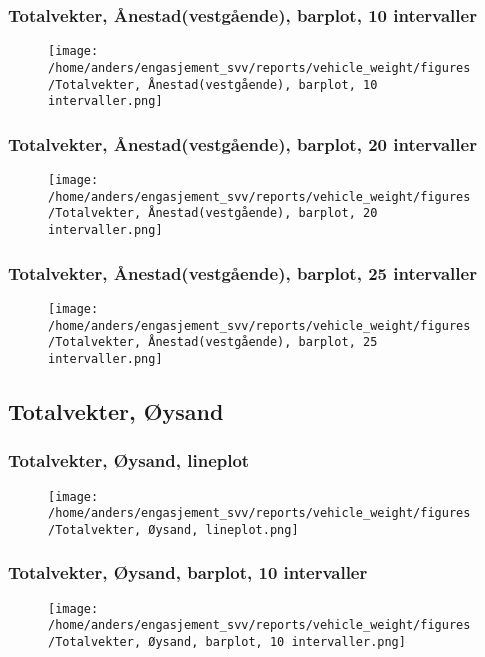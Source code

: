 \documentclass{article}
\begin{document}
\subsubsection{Totalvekter, Ånestad(vestgående), barplot, 10 intervaller}
\begin{figure}[H]
\centering
\texttt{[image: /home/anders/engasjement\_svv/reports/vehicle\_weight/figures/Totalvekter, Ånestad(vestgående), barplot, 10 intervaller.png]}
\end{figure}
\subsubsection{Totalvekter, Ånestad(vestgående), barplot, 20 intervaller}
\begin{figure}[H]
\centering
\texttt{[image: /home/anders/engasjement\_svv/reports/vehicle\_weight/figures/Totalvekter, Ånestad(vestgående), barplot, 20 intervaller.png]}
\end{figure}
\subsubsection{Totalvekter, Ånestad(vestgående), barplot, 25 intervaller}
\begin{figure}[H]
\centering
\texttt{[image: /home/anders/engasjement\_svv/reports/vehicle\_weight/figures/Totalvekter, Ånestad(vestgående), barplot, 25 intervaller.png]}
\end{figure}
\subsection{Totalvekter, Øysand}
\subsubsection{Totalvekter, Øysand, lineplot}
\begin{figure}[H]
\centering
\texttt{[image: /home/anders/engasjement\_svv/reports/vehicle\_weight/figures/Totalvekter, Øysand, lineplot.png]}
\end{figure}
\subsubsection{Totalvekter, Øysand, barplot, 10 intervaller}
\begin{figure}[H]
\centering
\texttt{[image: /home/anders/engasjement\_svv/reports/vehicle\_weight/figures/Totalvekter, Øysand, barplot, 10 intervaller.png]}
\end{figure}
\end{document}
